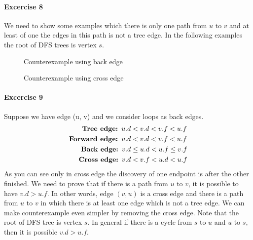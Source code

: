 \documentclass{book}
\begin{document}
	\paragraph{Excercise 8}
	We need to show some examples which there is only one path from $u$ to $v$ and at least of one the edges in this path is not a tree edge. In the following examples the root of DFS trees is vertex $s$.
	\begin{figure}[h!]
		\centering
		\caption{Counterexample using back edge}
	\end{figure}	
	\begin{figure}[h!]
		\centering
		\caption{Counterexample using cross edge}
	\end{figure}
	\FloatBarrier
	\paragraph{Excercise 9}
	Suppose we have edge (u, v) and we consider loops as back edges.
	\begin{align*}	
	\begin{split}
	\text{\textbf{Tree edge: }} u.d &< v.d < v.f < u.f \\
	\text{\textbf{Forward edge: }} u.d &< v.d < v.f < u.f \\
	\text{\textbf{Back edge: }} v.d &\le u.d < u.f \le v.f \\
	\text{\textbf{Cross edge: }} v.d &< v.f < u.d < u.f \\
	\end{split}
	\end{align*}
	As you can see only in cross edge the discovery of one endpoint is after the other finished. We need to prove that if there is a path from $u$ to $v$, it is possible to have $v.d > u.f$. In other words, edge $(v, u)$ is a cross edge and there is a path from $u$ to $v$ in which there is at least one edge which is not a tree edge. We can make counterexample even simpler by removing the cross edge. Note that the root of DFS tree is vertex $s$. In general if there is a cycle from $s$ to $u$ and $u$ to $s$, then it is possible $v.d > u.f$.
	
\end{document}
